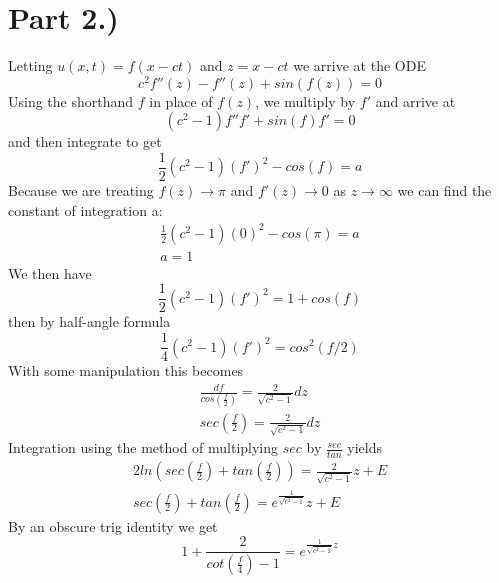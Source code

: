 \documentclass{article}
\begin{document}
\section*{Part 2.)}
Letting $u(x, t) = f(x - ct)$ and $z = x-ct$ we arrive at the ODE
\begin{equation}
c^2f''(z) - f''(z) + sin(f(z)) = 0
\end{equation}
Using the shorthand $f$ in place of $f(z)$, we multiply by $f'$ and arrive at 
\begin{equation}
(c^2 -1)f''f' + sin(f)f' = 0
\end{equation}
and then integrate to get
\begin{equation}
\frac{1}{2}(c^2 - 1)(f')^2 - cos(f) = a
\end{equation}
Because we are treating $f(z) \to \pi$ and $f'(z) \to 0$ as $z \to \infty$ we can find the constant of integration a:
\begin{equation}
\begin{aligned}
\frac{1}{2}(c^2 - 1)(0)^2 - cos(\pi) = a\\
a = 1
\end{aligned}
\end{equation}
We then have
\begin{equation}
\frac{1}{2}(c^2 -1)(f')^2 = 1+ cos(f) 
\end{equation}
then by half-angle formula
\begin{equation}
\frac{1}{4}(c^2 -1)(f')^2 = cos^2(f/2) 
\end{equation}
With some manipulation this becomes
\begin{equation}
\begin{aligned}
\frac{df}{cos(\frac{f}{2})} = \frac{2}{\sqrt{c^2-1}}dz\\
sec(\frac{f}{2}) = \frac{2}{\sqrt{c^2-1}}dz
\end{aligned}
\end{equation}
\noindent
Integration using the method of multiplying $sec$ by $\frac{sec}{tan}$ yields
\begin{equation}
\begin{aligned}
2ln(sec(\frac{f}{2}) + tan(\frac{f}{2})) = \frac{2}{\sqrt{c^2-1}} z + E\\
sec(\frac{f}{2}) + tan(\frac{f}{2}) = e^{\frac{1}{\sqrt{c^2-1}}} z + E
\end{aligned}
\end{equation}
By an obscure trig identity we get
\begin{equation}
1 + \frac{2}{cot(\frac{f}{4}) -1} = e^{\frac{1}{\sqrt{c^2-1}}z}
\end{equation}
\end{document}

